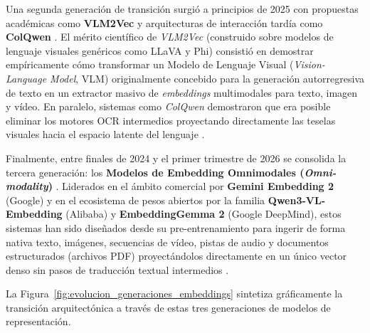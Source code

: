 Una segunda generación de transición surgió a principios de 2025 con propuestas académicas como \textbf{VLM2Vec} y arquitecturas de interacción tardía como \textbf{ColQwen} \cite{prajwal2025multimodal}. El mérito científico de \textit{VLM2Vec} (construido sobre modelos de lenguaje visuales genéricos como LLaVA y Phi) consistió en demostrar empíricamente cómo transformar un Modelo de Lenguaje Visual (\textit{Vision-Language Model}, VLM) originalmente concebido para la generación autorregresiva de texto en un extractor masivo de \textit{embeddings} multimodales para texto, imagen y vídeo. En paralelo, sistemas como \textit{ColQwen} demostraron que era posible eliminar los motores OCR intermedios proyectando directamente las teselas visuales hacia el espacio latente del lenguaje \cite{prajwal2025multimodal}.

Finalmente, entre finales de 2024 y el primer trimestre de 2026 se consolida la tercera generación: los \textbf{Modelos de Embedding Omnimodales (\textit{Omni-modality})} \cite{gemini_emb2_docs, qwen3_vl_emb2026}. Liderados en el ámbito comercial por \textbf{Gemini Embedding 2} (Google) y en el ecosistema de pesos abiertos por la familia \textbf{Qwen3-VL-Embedding} (Alibaba) y \textbf{EmbeddingGemma 2} (Google DeepMind), estos sistemas han sido diseñados desde su pre-entrenamiento para ingerir de forma nativa texto, imágenes, secuencias de vídeo, pistas de audio y documentos estructurados (archivos PDF) proyectándolos directamente en un único vector denso sin pasos de traducción textual intermedios \cite{gemini_emb2_docs, qwen3_vl_emb2026}.

La Figura~\ref{fig:evolucion_generaciones_embeddings} sintetiza gráficamente la transición arquitectónica a través de estas tres generaciones de modelos de representación.


